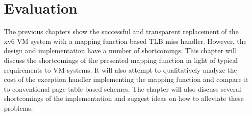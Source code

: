 \chapter{Evaluation}
\label{chap:eval}










The previous chapters show the successful and transparent replacement of the xv6 VM system with a mapping function based TLB miss handler. However, the design and implementation have a number of shortcomings.
This chapter will discuss the shortcomings of the presented mapping function in light of typical requirements to VM systems. It will also attempt to qualitatively analyze the cost of the exception handler implementing the mapping function and compare it to conventional page table based schemes. The chapter will also discuss several shortcomings of the implementation and suggest ideas on how to alleviate these problems.

